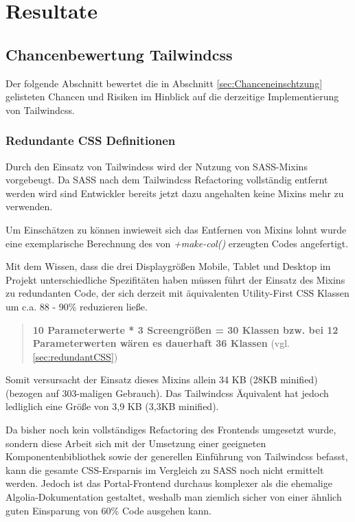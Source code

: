\chapter{Resultate}
\label{cha:Ergebnisse}

\section{Chancenbewertung Tailwindcss}
Der folgende Abschnitt bewertet die in Abschnitt \ref{sec:Chanceneinschtzung} gelisteten Chancen und Risiken im Hinblick auf die derzeitige Implementierung von Tailwindcss.
\subsection{Redundante CSS Definitionen}
\label{subsec:redundantCSS}
Durch den Einsatz von Tailwindcss wird der Nutzung von SASS-Mixins vorgebeugt. Da SASS nach dem Tailwindcss Refactoring vollständig entfernt werden wird sind Entwickler bereits jetzt dazu angehalten keine Mixins mehr zu verwenden.

Um Einschätzen zu können inwieweit sich das Entfernen von Mixins lohnt wurde eine exemplarische Berechnung des von \textit{+make-col()} erzeugten Codes angefertigt.

Mit dem Wissen, dass die drei Displaygrößen Mobile, Tablet und Desktop im Projekt unterschiedliche Spezifitäten haben müssen führt der Einsatz des Mixins zu redundanten Code, der sich derzeit mit äquivalenten Utility-First CSS Klassen um c.a. 88 - 90\% reduzieren ließe. 

\begin{quotation}
	\textbf{10 Parameterwerte * 3 Screengrößen = 30 Klassen bzw. bei 12 Parameterwerten wären es dauerhaft 36 Klassen} (vgl. \ref{sec:redundantCSS})
\end{quotation}

Somit versursacht der Einsatz dieses Mixins allein 34 KB (28KB minified) (bezogen auf 303-maligen Gebrauch). Das Tailwindcss Äquivalent hat jedoch ledliglich eine Größe von 3,9 KB (3,3KB minified).

Da bisher noch kein vollständiges Refactoring des Frontends umgesetzt wurde, sondern diese Arbeit sich mit der Umsetzung einer geeigneten Komponentenbibliothek sowie der generellen Einführung von Tailwindcss befasst, kann die gesamte CSS-Ersparnis im Vergleich zu SASS noch nicht ermittelt werden. Jedoch ist das Portal-Frontend durchaus komplexer als die ehemalige Algolia-Dokumentation \citep{AlgoliaTailwindBlog} gestaltet, weshalb man ziemlich sicher von einer ähnlich guten Einsparung von 60\% Code ausgehen kann.

